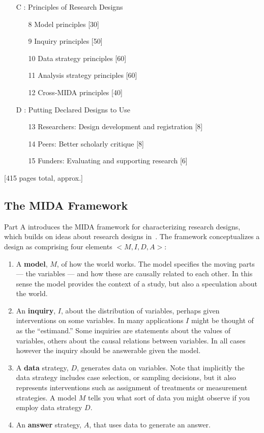 \documentclass[11pt]{article}
\begin{document}
\begin{framed}
\begin{enumerate}
		\item[C]: Principles of Research Designs
		\begin{enumerate}
			\item[8] Model principles [30]
			\item[9] Inquiry principles [50]
			\item[10] Data strategy principles [60]
			\item[11] Analysis strategy principles [60]
			\item[12] Cross-MIDA principles [40]
		\end{enumerate}
	\item[D]: Putting Declared Designs to Use
				\begin{enumerate}
					\item[13] Researchers: Design development and registration [8]				
					\item[14]  Peers: Better scholarly critique [8]
          \item[15]  Funders: Evaluating and supporting research [6]   
				\end{enumerate}
				
	\end{enumerate}
	[415 pages total, approx.]
\end{framed}


\subsection{The MIDA Framework}

Part A introduces the MIDA framework for characterizing research designs, which builds on ideas about research designs in~\cite{king1994designing}. The framework conceptualizes a design as comprising four elements $<M,I,D,A>$:
\begin{enumerate}
	\item A \textbf{model}, $M$, of how the world works. The model specifies the moving parts --- the variables --- and how these are causally related to each other. In this sense the model provides the context of a study, but also a speculation about the world.    
	\item An \textbf{inquiry}, $I$, about the distribution of variables, perhaps given interventions on some variables.  In many applications $I$ might be thought of as the ``estimand.'' Some inquiries are statements about the values of variables, others about the causal relations between variables. In all cases however the inquiry should be answerable given the model.   
	\item A \textbf{data} strategy, $D$, generates data on variables.  Note that implicitly the data strategy includes case selection, or sampling decisions, but it also represents interventions such as assignment of treatments or measurement strategies. A model $M$ tells you what sort of data you might observe if you employ data strategy $D$.  
	\item An \textbf{answer} strategy, $A$, that uses data to generate an answer.  
\end{enumerate}
\end{document}
